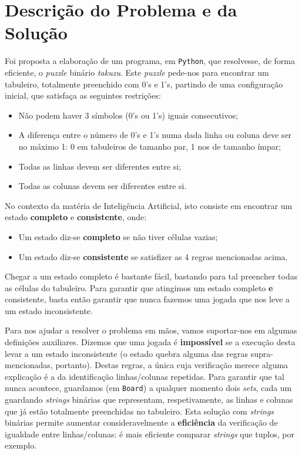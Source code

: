 \documentclass[12pt,a4paper]{article}
\begin{document}
\section*{Descrição do Problema e da Solução}

Foi proposta a elaboração de um programa, em \texttt{Python}, que resolvesse, de
forma eficiente, o \textit{puzzle} binário \textit{takuzu}.
Este \textit{puzzle} pede-nos para encontrar um tabuleiro, totalmente preenchido
com 0's e 1's, partindo de uma configuração inicial, que satisfaça as seguintes restrições:
\begin{itemize}
      \item Não podem haver 3 símbolos (0's ou 1's) iguais consecutivos;
      \item A diferença entre o número de 0's e 1's numa dada linha ou coluna deve
            ser no máximo 1: 0 em tabuleiros de tamanho par, 1 nos de tamanho ímpar;
      \item Todas as linhas devem ser diferentes entre si;
      \item Todas as colunas devem ser diferentes entre si.
\end{itemize}

No contexto da matéria de Inteligência Artificial, isto consiste em encontrar um
estado \textbf{completo} e \textbf{consistente}, onde:
\begin{itemize}
      \item Um estado diz-se \textbf{completo} se não tiver células vazias;
      \item Um estado diz-se \textbf{consistente} se satisfizer as 4 regras mencionadas acima.
\end{itemize}

Chegar a um estado completo é bastante fácil, bastando para tal preencher todas as células do tabuleiro.
Para garantir que atingimos um estado completo \textbf{e} consistente, basta então
garantir que nunca fazemos uma jogada que nos leve a um estado inconsistente.


Para nos ajudar a resolver o problema em mãos, vamos suportar-nos em algumas definições auxiliares.
Dizemos que uma jogada é \textbf{impossível} se a execução desta levar a um estado
inconsistente (o estado quebra alguma das regras supra-mencionadas, portanto).
Destas regras, a única cuja verificação merece alguma explicação é a da identificação
linhas/colunas repetidas.
Para garantir que tal nunca acontece, guardamos (em \texttt{Board}) a qualquer momento
dois \textit{sets}, cada um guardando \textit{strings} binárias que representam,
respetivamente, as linhas e colunas que já estão totalmente preenchidas no tabuleiro.
Esta solução com \textit{strings} binárias permite aumentar consideravelmente a
\textbf{eficiência} da verificação de igualdade entre linhas/colunas: é mais eficiente
comparar \textit{strings} que tuplos, por exemplo.
\end{document}
